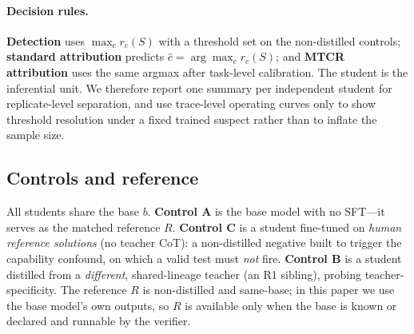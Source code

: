 \paragraph{Decision rules.}
\textbf{Detection} uses $\max_c r_c(S)$ with a threshold set on the non-distilled
controls; \textbf{standard attribution} predicts $\hat c=\arg\max_c r_c(S)$; and
\textbf{MTCR attribution} uses the same argmax after task-level calibration. The
student is the inferential unit. We therefore report one summary per independent
student for replicate-level separation, and use trace-level operating curves only to
show threshold resolution under a fixed trained suspect rather than to inflate the
sample size.

\subsection{Controls and reference}
\label{sec:method:controls}
All students share the base $b$. \textbf{Control A} is the base model with no SFT---it
serves as the matched reference $R$. \textbf{Control C} is a student fine-tuned on
\emph{human reference solutions} (no teacher CoT): a non-distilled negative built to
trigger the capability confound, on which a valid test must \emph{not} fire.
\textbf{Control B} is a student distilled from a \emph{different}, shared-lineage
teacher (an R1 sibling), probing teacher-specificity. The reference $R$ is non-distilled
and same-base; in this paper we use the base model's own outputs, so $R$ is available
only when the base is known or declared and runnable by the verifier.
